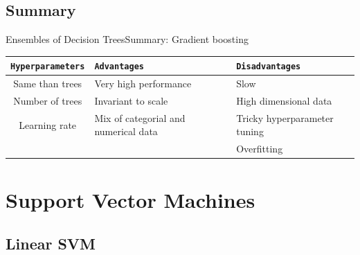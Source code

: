 \documentclass[10pt,compress]{beamer} %
\begin{document}
\subsection{Summary}
\begin{frame}{Ensembles of Decision Trees}{Summary: Gradient boosting}
	\begin{center}
	\begin{tabular}{cp{3cm}p{3cm}}\hline
	 	\texttt{Hyperparameters}  & \texttt{Advantages}  & \texttt{Disadvantages} \\\hline
	 	Same than trees           & Very high performance& Slow  \\
	 	Number of trees           & Invariant to scale   & High dimensional data  \\
	 	Learning rate             & Mix of categorial and numerical data & Tricky hyperparameter tuning  \\
	 	                          &                      & Overfitting  \\
	 	\hline
	\end{tabular}
	\end{center}
\end{frame}

\section{Support Vector Machines}
\subsection{Linear SVM}
\end{document}
